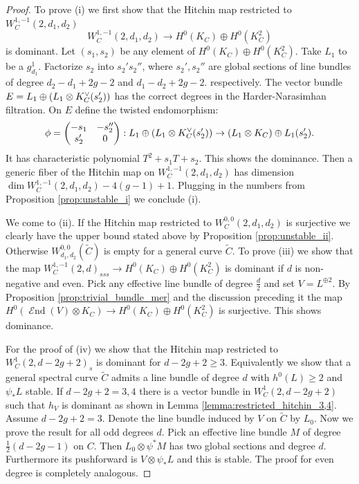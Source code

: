 \documentclass[12pt]{extarticle}
\theoremstyle{definition}
\numberwithin{theorem}{section}
\DeclareMathOperator{\End}{\mathcal{E}nd}
\renewcommand{\tilde}{\widetilde}		%
\let\div\relax							%
\DeclareMathOperator{\div}{div}
\begin{document}
\begin{proof}
To prove (i) we first show that the Hitchin map restricted to $W^{1,-1}_C(2,d_1,d_2)$
\begin{equation*}
W_C^{1,-1}(2,d_1,d_2) \to H^0(K_C) \oplus H^0(K_C^2)
\end{equation*} 
is dominant. Let $(s_1,s_2)$ be any element of $H^0(K_C)\oplus H^0(K_C^2)$. Take $L_1$ to be a $g^1_{d_1}$. Factorize $s_2$ into $s_2's_2''$, where $s_2',s_2''$ are global sections of line bundles of degree $d_2 - d_1+2g-2$ and $d_1 - d_2 + 2g -2$. respectively. The vector bundle $E = L_1 \oplus (L_1 \otimes K_C^\vee(\div s_2'))$ has the correct degrees in the Harder-Narasimhan filtration. On $E$ define the twisted endomorphism:
\begin{equation*}
\phi = \begin{pmatrix}
-s_1 & -s_2'' \\
s_2' & 0
\end{pmatrix} : L_1 \oplus (L_1 \otimes K_C^\vee(\div s_2')) \to (L_1 \otimes K_C) \oplus L_1(\div s_2').
\end{equation*}
It has characteristic polynomial $T^2 + s_1T + s_2$. This shows the dominance. Then a generic fiber of the Hitchin map on $W_C^{1,-1}(2,d_1,d_2)$ has dimension $\dim W_C^{1,-1}(2,d_1,d_2) - 4(g-1)+1$. Plugging in the numbers from Proposition \ref{prop:unstable_i} we conclude (i). 

We come to (ii). If the Hitchin map restricted to $W_C^{0,0}(2,d_1,d_2)$ is surjective we clearly have the upper bound stated above by Proposition \ref{prop:unstable_ii}. Otherwise $W^{0,0}_{d_1,d_2}(\tilde{C})$ is empty for a general curve $\tilde{C}$.
To prove (iii) we show that the map $W_C^{1,-1}(2,d)_{sss} \to H^0(K_C)\oplus H^0(K_C^2)$ is dominant if $d$ is non-negative and even. Pick any effective line bundle of degree $\frac{d}{2}$ and set $V = L^{\oplus 2}$. By Proposition \ref{prop:trivial_bundle_mer} and the discussion preceding it the map $H^0(\End(V)\otimes K_C) \to H^0(K_C)\oplus H^0(K_C^2)$ is surjective. This shows dominance.

For the proof of (iv) we show that the Hitchin map restricted to $W_C^1(2,d-2g+2)_{s}$ is dominant for $d-2g+2 \geq 3$. Equivalently we show that a general spectral curve $\tilde{C}$ admits a line bundle of degree $d$ with $h^0(L)\geq 2$ and $\psi_*L$ stable. If $d-2g+2 = 3,4$ there is a vector bundle in $W^1_C(2,d-2g+2)$ such that $h_V$ is dominant as shown in Lemma \ref{lemma:restricted_hitchin_3,4}.
Assume $d-2g+2 = 3$. Denote the line bundle induced by $V$ on $\tilde{C}$ by $L_0$. Now we prove the result for all odd degrees $d$. Pick an effective line bundle $M$ of degree $\frac{1}{2}(d - 2g -1)$ on $C$. Then $L_0 \otimes \psi^*M$ has two global sections and degree $d$. Furthermore its pushforward is $V\otimes \psi_*L$ and this is stable. 
The proof for even degree is completely analogous.
\end{proof}
\end{document}
